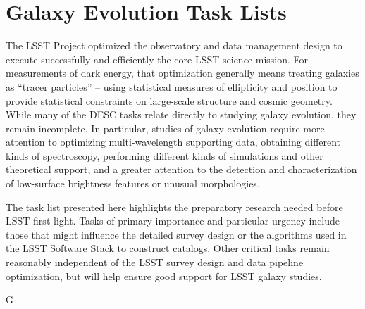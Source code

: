 
\section{Galaxy Evolution Task Lists}\label{sec:tasks:gal:intro}  
{\justify
The LSST Project optimized the observatory and data management design
to execute successfully and efficiently the core LSST science mission. 
For measurements
of dark energy, that optimization generally means treating galaxies as ``tracer particles'' --
 using statistical measures of ellipticity and position to provide statistical
constraints on large-scale structure and cosmic geometry. While many of the
DESC tasks relate directly to studying galaxy evolution, they remain 
incomplete. In particular, studies of galaxy evolution require more attention to 
optimizing multi-wavelength supporting data, obtaining different kinds of spectroscopy, 
performing different
kinds of simulations and other theoretical support, and a greater attention to 
the detection
and characterization of low-surface brightness features or unusual morphologies.

The task list presented here highlights the preparatory research needed 
before LSST first light.
Tasks of primary importance and particular urgency include those that might influence the detailed survey
design or the algorithms used in the LSST Software Stack to construct catalogs. 
Other critical tasks remain reasonably independent of the
LSST survey design and data pipeline optimization, but will help ensure good support for
LSST galaxy studies.

\begin{tasklist}{G}


\end{tasklist}}
